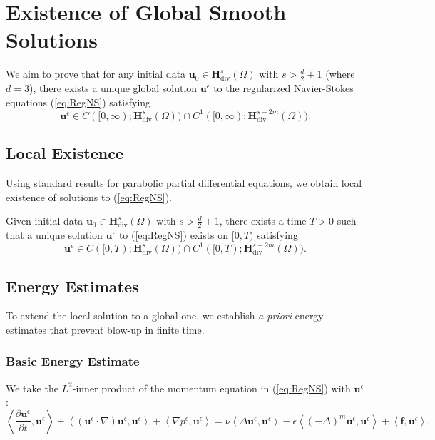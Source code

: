\documentclass[11pt]{article}
\begin{document}
\section{Existence of Global Smooth Solutions}

We aim to prove that for any initial data $\mathbf{u}_0 \in \mathbf{H}^s_{\text{div}}(\Omega)$ with $s > \frac{d}{2} + 1$ (where $d=3$), there exists a unique global solution $\mathbf{u}^\epsilon$ to the regularized Navier-Stokes equations (\ref{eq:RegNS}) satisfying
\begin{equation}
\mathbf{u}^\epsilon \in C([0, \infty); \mathbf{H}^s_{\text{div}}(\Omega)) \cap C^1([0, \infty); \mathbf{H}^{s - 2m}_{\text{div}}(\Omega)).
\end{equation}

\subsection{Local Existence}

Using standard results for parabolic partial differential equations, we obtain local existence of solutions to (\ref{eq:RegNS}).

\begin{theorem}
Given initial data $\mathbf{u}_0 \in \mathbf{H}^s_{\text{div}}(\Omega)$ with $s > \frac{d}{2} + 1$, there exists a time $T > 0$ such that a unique solution $\mathbf{u}^\epsilon$ to (\ref{eq:RegNS}) exists on $[0, T)$ satisfying
\begin{equation}
\mathbf{u}^\epsilon \in C([0, T); \mathbf{H}^s_{\text{div}}(\Omega)) \cap C^1([0, T); \mathbf{H}^{s - 2m}_{\text{div}}(\Omega)).
\end{equation}
\end{theorem}

\subsection{Energy Estimates}

To extend the local solution to a global one, we establish \textit{a priori} energy estimates that prevent blow-up in finite time.

\subsubsection{Basic Energy Estimate}

We take the $L^2$-inner product of the momentum equation in (\ref{eq:RegNS}) with $\mathbf{u}^\epsilon$:
\begin{equation}
\left\langle \frac{\partial \mathbf{u}^\epsilon}{\partial t}, \mathbf{u}^\epsilon \right\rangle + \left\langle (\mathbf{u}^\epsilon \cdot \nabla) \mathbf{u}^\epsilon, \mathbf{u}^\epsilon \right\rangle + \left\langle \nabla p^\epsilon, \mathbf{u}^\epsilon \right\rangle = \nu \left\langle \Delta \mathbf{u}^\epsilon, \mathbf{u}^\epsilon \right\rangle - \epsilon \left\langle (-\Delta)^m \mathbf{u}^\epsilon, \mathbf{u}^\epsilon \right\rangle + \left\langle \mathbf{f}, \mathbf{u}^\epsilon \right\rangle.
\end{equation}
\end{document}
